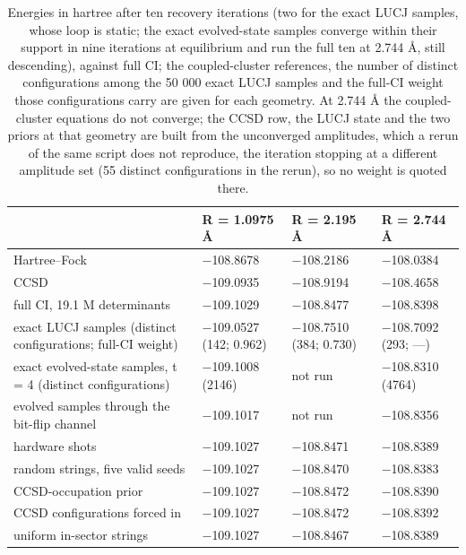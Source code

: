 \documentclass[11pt]{article}
\begin{document}
\begin{table}[htbp]
\centering
\caption{Energies in hartree after ten recovery iterations (two for the exact LUCJ samples, whose loop is static; the exact evolved-state samples converge within their support in nine iterations at equilibrium and run the full ten at 2.744 \AA{}, still descending), against full CI; the coupled-cluster references, the number of distinct configurations among the 50 000 exact LUCJ samples and the full-CI weight those configurations carry are given for each geometry. At 2.744 \AA{} the coupled-cluster equations do not converge; the CCSD row, the LUCJ state and the two priors at that geometry are built from the unconverged amplitudes, which a rerun of the same script does not reproduce, the iteration stopping at a different amplitude set (55 distinct configurations in the rerun), so no weight is quoted there.}\label{tab:8}
\small
\renewcommand{\arraystretch}{1.3}

\begin{tabularx}{\linewidth}{@{}>{\hsize=1.000\hsize\raggedright\arraybackslash}Xlll@{}}
\toprule
 & R = 1.0975 \AA{} & R = 2.195 \AA{} & R = 2.744 \AA{} \\
\midrule
Hartree--Fock & $-$108.8678 & $-$108.2186 & $-$108.0384 \\
CCSD & $-$109.0935 & $-$108.9194 & $-$108.4658 \\
full CI, 19.1 M determinants & $-$109.1029 & $-$108.8477 & $-$108.8398 \\
exact LUCJ samples (distinct configurations; full-CI weight) & $-$109.0527 (142; 0.962) & $-$108.7510 (384; 0.730) & $-$108.7092 (293; ---) \\
exact evolved-state samples, t = 4 (distinct configurations) & $-$109.1008 (2146) & not run & $-$108.8310 (4764) \\
evolved samples through the bit-flip channel & $-$109.1017 & not run & $-$108.8356 \\
hardware shots & $-$109.1027 & $-$108.8471 & $-$108.8389 \\
random strings, five valid seeds & $-$109.1027 & $-$108.8470 & $-$108.8383 \\
CCSD-occupation prior & $-$109.1027 & $-$108.8472 & $-$108.8390 \\
CCSD configurations forced in & $-$109.1027 & $-$108.8472 & $-$108.8392 \\
uniform in-sector strings & $-$109.1027 & $-$108.8467 & $-$108.8389 \\
\bottomrule
\end{tabularx}
\end{table}
\end{document}
